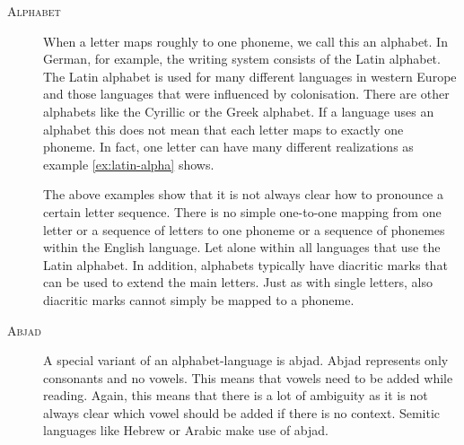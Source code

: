 \begin{description}
\item[\textsc{Alphabet}] When a letter maps roughly to one phoneme, we call this an alphabet. In German, for example, the writing system consists of the Latin alphabet. The Latin alphabet is used for many different languages in western Europe and those languages that were influenced by colonisation. There are other alphabets like the Cyrillic or the Greek alphabet. If a language uses an alphabet this does not mean that each letter maps to exactly one phoneme. In fact, one letter can have many different realizations as example \ref{ex:latin-alpha} shows.

The above examples show that it is not always clear how to pronounce a certain letter sequence. There is no simple one-to-one mapping from one letter or a sequence of letters to one phoneme or a sequence of phonemes within the English language. Let alone within all languages that use the Latin alphabet. In addition, alphabets typically have diacritic marks that can be used to extend the main letters. Just as with single letters, also diacritic marks cannot simply be mapped to a phoneme.

\item[\textsc{Abjad}] A special variant of an alphabet-language is abjad. Abjad represents only consonants and no vowels. This means that vowels need to be added while reading. Again, this means that there is a lot of ambiguity as it is not always clear which vowel should be added if there is no context. Semitic languages like Hebrew or Arabic make use of abjad.


\end{description}
